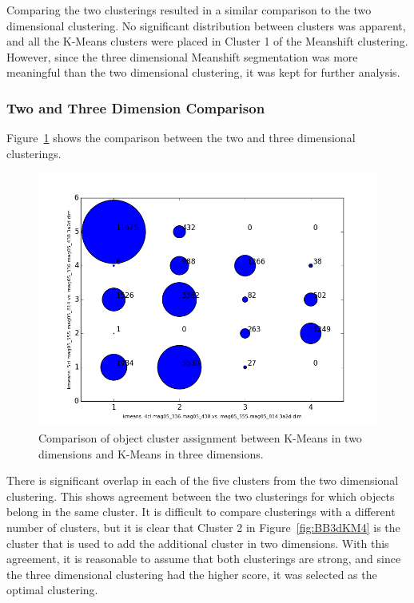 Comparing the two clusterings resulted in a similar comparison to the two dimensional clustering.
No significant distribution between clusters was apparent, and all the K-Means clusters were placed in Cluster 1 of the Meanshift clustering.
However, since the three dimensional Meanshift segmentation was more meaningful than the two dimensional clustering, it was kept for further analysis.

\subsubsection{Two and Three Dimension Comparison}
Figure~\ref{fig:BB3dKMcomp} shows the comparison between the two and three dimensional clusterings.

\begin{figure}[H]
\centering
\includegraphics[width=\linewidth]{figs/broad/kmeans-4cl_mag05_336-mag05_438_vs_kmeans-5cl_mag05_555-mag05_814_mag05_336-mag05_438_3a2ddim_compare}
\caption{Comparison of object cluster assignment between K-Means in two dimensions and K-Means in three dimensions.}
\label{fig:BB3dKMcomp}
\end{figure}

There is significant overlap in each of the five clusters from the two dimensional clustering.
This shows agreement between the two clusterings for which objects belong in the same cluster. 
It is difficult to compare clusterings with a different number of clusters, but it is clear that Cluster 2 in Figure~\ref{fig:BB3dKM4} is the cluster that is used to add the additional cluster in two dimensions.
With this agreement, it is reasonable to assume that both clusterings are strong, and since the three dimensional clustering had the higher score, it was selected as the optimal clustering.
%
%
%
%
%
%
%

